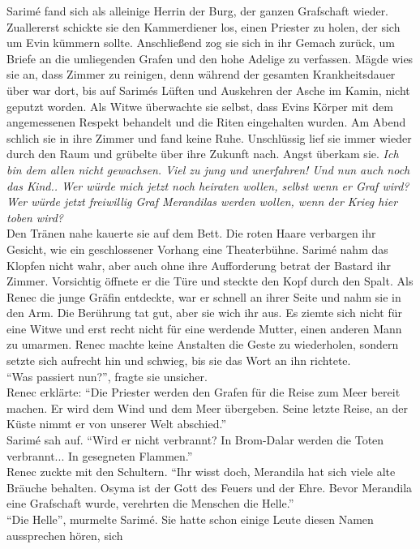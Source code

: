 Sarimé fand sich als alleinige Herrin der Burg, der ganzen Grafschaft wieder. Zuallererst schickte 
sie den Kammerdiener los, einen Priester zu holen, der sich um Evin kümmern sollte. Anschließend 
zog sie sich in ihr Gemach zurück, um Briefe an die umliegenden Grafen und den hohe Adelige zu 
verfassen. Mägde wies sie an, dass Zimmer zu reinigen, denn während der gesamten Krankheitsdauer 
über war dort, bis auf Sarimés Lüften und Auskehren der Asche im Kamin, nicht geputzt worden. Als 
Witwe überwachte sie selbst, dass Evins Körper mit dem angemessenen Respekt behandelt und die Riten 
eingehalten wurden. Am Abend schlich sie in ihre Zimmer und fand keine Ruhe. Unschlüssig lief sie 
immer wieder durch den Raum und grübelte über ihre Zukunft nach. Angst überkam sie.
\textit{Ich bin dem allen nicht gewachsen. Viel zu jung und unerfahren! Und nun auch noch das 
Kind.. Wer würde mich jetzt noch heiraten wollen, selbst wenn er Graf wird? Wer würde jetzt 
freiwillig Graf Merandilas werden wollen, wenn der Krieg hier toben wird?}\\
Den Tränen nahe kauerte sie auf dem Bett. Die roten Haare verbargen ihr Gesicht, wie ein 
geschlossener Vorhang eine Theaterbühne. Sarimé nahm das Klopfen nicht wahr, aber auch ohne ihre 
Aufforderung betrat der Bastard ihr Zimmer. Vorsichtig öffnete er die Türe und steckte den Kopf 
durch den Spalt. Als Renec die junge Gräfin entdeckte, war er schnell an ihrer Seite und nahm sie 
in den Arm. Die Berührung tat gut, aber sie wich ihr aus. Es ziemte sich nicht für eine Witwe und 
erst recht nicht für eine werdende Mutter, einen anderen Mann zu umarmen. Renec machte keine 
Anstalten die Geste zu wiederholen, sondern setzte sich aufrecht hin und schwieg, bis sie das Wort 
an ihn richtete.\\
``Was passiert nun?'', fragte sie unsicher.\\
Renec erklärte: ``Die Priester werden den Grafen für die Reise zum Meer bereit machen. Er wird dem 
Wind und dem Meer übergeben. Seine letzte Reise, an der Küste nimmt er von unserer Welt 
abschied.''\\
Sarimé sah auf. ``Wird er nicht verbrannt? In Brom-Dalar werden die Toten verbrannt... In 
gesegneten Flammen.''\\
Renec zuckte mit den Schultern. ``Ihr wisst doch, Merandila hat sich viele alte Bräuche behalten. 
Osyma ist der Gott des Feuers und der Ehre. Bevor Merandila eine Grafschaft wurde, verehrten die 
Menschen die Helle.''\\
``Die Helle'', murmelte Sarimé. Sie hatte schon einige Leute diesen Namen aussprechen hören, sich 
